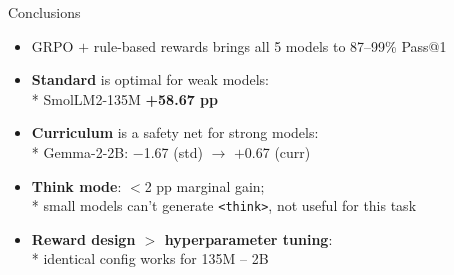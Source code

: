 \documentclass[10pt, aspectratio=169]{beamer}
\newcommand{\highlightnum}[2]{{\bfseries\color{#2}#1}}
\begin{document}
\begin{frame}{Conclusions}
  \vspace{0.2em}
  \begin{itemize}
    \setlength\itemsep{0.6em}
    \item[\textcolor{accent}{\faCheckCircle}] GRPO $+$ rule-based rewards brings all 5 models to
          \alert{87–99\% Pass@1}
    \item[\textcolor{sky}{\faRocket}] \textbf{Standard} is optimal for weak models:\\*
          SmolLM2-135M \highlightnum{+58.67 pp}{accent}
    \item[\textcolor{gold}{\faLock}] \textbf{Curriculum} is a safety net for strong models:\\*
          Gemma-2-2B: $-$1.67 (std) $\to$ $+$0.67 (curr)
    \item[\textcolor{slate}{\faBrain}] \textbf{Think mode}: $<$2 pp marginal gain;\\*
          small models can't generate \texttt{<think>}, not useful for this task
    \item[\textcolor{navy}{\faCog}] \textbf{Reward design $>$ hyperparameter tuning}:\\*
          identical config works for 135M – 2B
  \end{itemize}
\end{frame}
\end{document}
